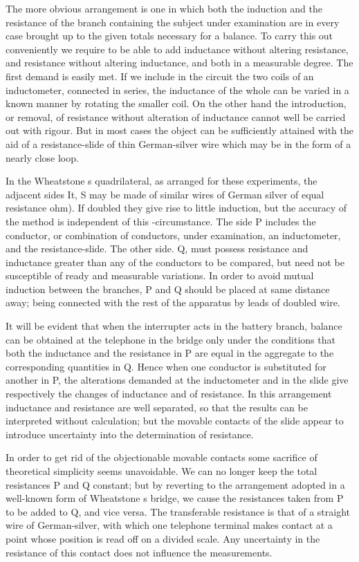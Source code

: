 The more obvious arrangement is one in which both the induction and the
resistance of the branch containing the subject under examination are in every
case brought up to the given totals necessary for a balance. To carry this out
conveniently we require to be able to add inductance without altering
resistance, and resistance without altering inductance, and both in a
measurable degree. The first demand is easily met. If we include in the
circuit the two coils of an inductometer, connected in series, the inductance
of the whole can be varied in a known manner by rotating the smaller coil. On
the other hand the introduction, or removal, of resistance without alteration
of inductance cannot well be carried out with rigour. But in most cases the
object can be sufficiently attained with the aid of a resistance-slide of thin
German-silver wire which may be in the form of a nearly close loop.

In the Wheatstone s quadrilateral, as arranged for these experiments, the
adjacent sides It, S may be made of similar wires of German silver of equal
resistance ohm). If doubled they give rise to little induction, but the
accuracy of the method is independent of this -circumstance. The side P
includes the conductor, or combination of conductors, under examination, an
inductometer, and the resistance-slide. The other side. Q, must possess
resistance and inductance greater than any of the conductors to be compared,
but need not be susceptible of ready and measurable variations. In order to
avoid mutual induction between the branches, P and Q should be placed at same
distance away; being connected with the rest of the apparatus by leads of
doubled wire.

It will be evident that when the interrupter acts in the battery branch,
balance can be obtained at the telephone in the bridge only under the
conditions that both the inductance and the resistance in P are equal in the
aggregate to the corresponding quantities in Q. Hence when one conductor is
substituted for another in P, the alterations demanded at the inductometer and
in the slide give respectively the changes of inductance and of resistance. In
this arrangement inductance and resistance are well separated, so that the
results can be interpreted without calculation; but the movable contacts of the
slide appear to introduce uncertainty into the determination of resistance.

In order to get rid of the objectionable movable contacts some sacrifice of
theoretical simplicity seems unavoidable. We can no longer keep the total
resistances P and Q constant; but by reverting to the arrangement adopted in a
well-known form of Wheatstone s bridge, we cause the resistances taken from P
to be added to Q, and vice versa. The transferable resistance is that of a
straight wire of German-silver, with which one telephone terminal makes contact
at a point whose position is read off on a
divided scale. Any uncertainty in the resistance of this contact does not
influence the measurements.

